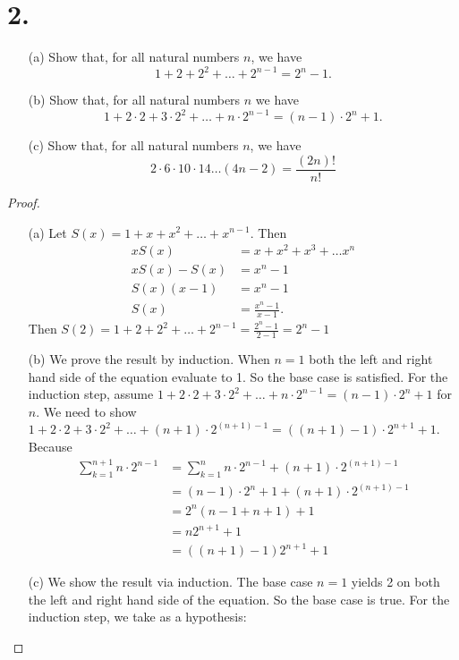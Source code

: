 \documentclass[]{article}
\begin{document}
\section*{2.}
\begin{enumerate}
	\item[(a)] Show that, for all natural numbers $n$, we have
	$$
	1 + 2 + 2^2 + \dots + 2^{n - 1} = 2^n - 1.
	$$
	\item[(b)] Show that, for all natural numbers $n$ we have
	$$
		1 + 2 \cdot 2 + 3 \cdot 2^2 + \dots + n \cdot 2^{n-1} = (n - 1) \cdot 2^n + 1.
	$$
	\item[(c)] Show that, for all natural numbers $n$, we have
	$$
		2 \cdot 6 \cdot 10 \cdot 14 \dots (4n - 2) = \frac{(2n)!}{n!}
	$$
\end{enumerate}

\begin{proof}
	\begin{enumerate}
		\item[(a)] Let $S(x) = 1 + x + x^2 + \dots + x^{n - 1}$. Then
		\begin{align*}
			xS(x) &= x + x^2 + x^3 + \dots x^n \\
			xS(x) - S(x) &= x^n - 1 \\
			S(x)(x - 1) &= x^n - 1 \\
			S(x) &= \frac{x^n - 1}{x - 1}.
		\end{align*}
		Then $S(2) = 1 + 2 + 2^2 + \dots + 2^{n - 1} = \frac{2^n - 1}{2 - 1} = 2^n - 1$
		\item[(b)] We prove the result by induction. When $n = 1$ both the left and right hand side of the equation evaluate to 1. So the base case is satisfied. For the induction step, assume $1 + 2 \cdot 2 + 3 \cdot 2^2 + \dots + n \cdot 2^{n-1} = (n - 1) \cdot 2^n + 1$ for $n$. We need to show $1 + 2 \cdot 2 + 3 \cdot 2^2 + \dots + (n + 1) \cdot 2^{(n + 1)-1} = ((n + 1) - 1) \cdot 2^{n + 1} + 1$. Because
		\begin{align*}
			\sum_{k=1}^{n + 1} n \cdot 2^{n-1} &= \sum_{k=1}^{n} n \cdot 2^{n-1} + (n + 1) \cdot 2^{(n + 1)-1} \\
			&= (n - 1) \cdot 2^n + 1 + (n + 1) \cdot 2^{(n + 1)-1} \\
			&= 2^n(n - 1 + n + 1) + 1 \\
			&= n2^{n + 1} + 1 \\
			&= ((n + 1) - 1)2^{n + 1} + 1
		\end{align*}
		\item[(c)] We show the result via induction. The base case $n = 1$ yields 2 on both the left and right hand side of the equation. So the base case is true. For the induction step, we take as a hypothesis:

\end{enumerate}
\end{proof}
\end{document}
